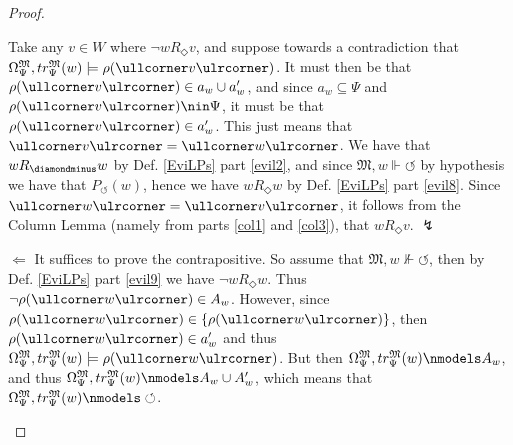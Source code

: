 \documentclass[11pt]{article}
\newcommand{\DD}{\diamondminus}
\newcommand{\Pos}{\Diamond}
\newcommand{\lc}{\ullcorner}
\newcommand{\rc}{\ulrcorner}
\begin{document}
\begin{proof}
\begin{peano}
\begin{peano}
Take any $v \in W$ where $\neg w R_\Pos v$, and suppose towards a contradiction that $\Omega_{\Psi}^\mathfrak{M}, tr_{\Psi}^\mathfrak{M}(w) \models \rho(\lc v \rc)$.  It must then be that $\rho(\lc v \rc) \in a_w \cup a'_w$, and since $a_w \subseteq \Psi$ and $\rho(\lc v \rc) \nin \Psi$, it must be that $\rho(\lc v \rc) \in a'_w$.  This just means that $\lc v \rc = \lc w \rc$.  We have that $w R_\DD w$ by Def. \ref{EviLPs} part \ref{evil2}, and since $\mathfrak{M},w \Vdash \circlearrowleft$ by hypothesis we have that $P_\circlearrowleft(w)$, hence we have $w R_\Pos w$ by  Def. \ref{EviLPs} part \ref{evil8}.  Since $\lc w \rc = \lc v \rc$, it follows from the Column Lemma (namely from parts \ref{col1} and \ref{col3}), that $w R_\Pos v$. $\lightning$

 	\item $\Leftarrow$ It suffices to prove the contrapositive. So assume that $\mathfrak{M},w \nVdash \circlearrowleft$, then by Def. \ref{EviLPs} part \ref{evil9} we have $\neg w R_\Pos w$.  Thus $\neg \rho(\lc w \rc) \in A_w$.  However, since $\rho(\lc w \rc) \in \{ \rho(\lc w \rc) \}$, then $\rho(\lc w \rc) \in a'_w$ and thus $\Omega_{\Psi}^\mathfrak{M}, tr_{\Psi}^\mathfrak{M}(w) \models \rho(\lc w \rc)$.  But then $\Omega_{\Psi}^\mathfrak{M}, tr_{\Psi}^\mathfrak{M}(w) \nmodels A_w$, and thus $\Omega_{\Psi}^\mathfrak{M}, tr_{\Psi}^\mathfrak{M}(w) \nmodels A_w \cup A'_w$, which means that $\Omega_{\Psi}^\mathfrak{M}, tr_{\Psi}^\mathfrak{M}(w) \nmodels \circlearrowleft$.
 \end{peano}
 \end{peano}
 \end{proof}
\pagebreak
{}


\end{document}
